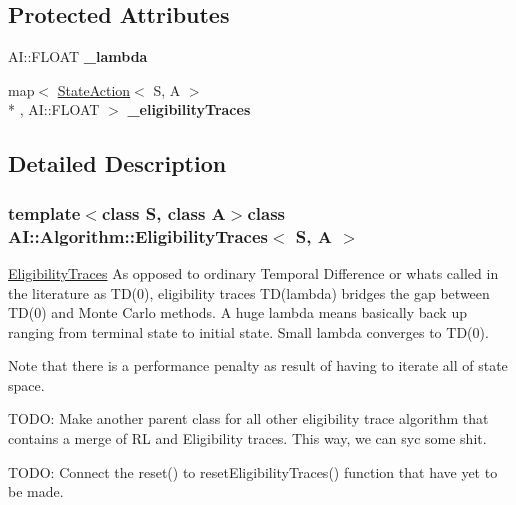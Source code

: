 \subsection*{Protected Attributes}
\begin{DoxyCompactItemize}
\item 
\hypertarget{classAI_1_1Algorithm_1_1EligibilityTraces_a5c7e8c5c912cd0402cd4d60fb7c34da3}{A\-I\-::\-F\-L\-O\-A\-T {\bfseries \-\_\-lambda}}\label{classAI_1_1Algorithm_1_1EligibilityTraces_a5c7e8c5c912cd0402cd4d60fb7c34da3}

\item 
\hypertarget{classAI_1_1Algorithm_1_1EligibilityTraces_aa4a94928533e63cb6b263f7abfde4e53}{map$<$ \hyperlink{classAI_1_1StateAction}{State\-Action}$<$ S, A $>$\\*
, A\-I\-::\-F\-L\-O\-A\-T $>$ {\bfseries \-\_\-eligibility\-Traces}}\label{classAI_1_1Algorithm_1_1EligibilityTraces_aa4a94928533e63cb6b263f7abfde4e53}

\end{DoxyCompactItemize}


\subsection{Detailed Description}
\subsubsection*{template$<$class S, class A$>$class A\-I\-::\-Algorithm\-::\-Eligibility\-Traces$<$ S, A $>$}

\hyperlink{classAI_1_1Algorithm_1_1EligibilityTraces}{Eligibility\-Traces} As opposed to ordinary Temporal Difference or whats called in the literature as T\-D(0), eligibility traces T\-D(lambda) bridges the gap between T\-D(0) and Monte Carlo methods. A huge lambda means basically back up ranging from terminal state to initial state. Small lambda converges to T\-D(0).

Note that there is a performance penalty as result of having to iterate all of state space.

T\-O\-D\-O\-: Make another parent class for all other eligibility trace algorithm that contains a merge of R\-L and Eligibility traces. This way, we can syc some shit.

T\-O\-D\-O\-: Connect the reset() to reset\-Eligibility\-Traces() function that have yet to be made. 


